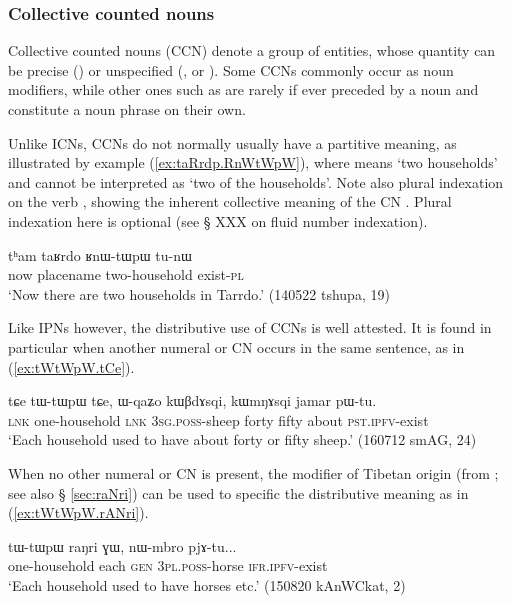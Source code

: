 \subsubsection{Collective counted nouns} \label{sec:CCN}
Collective counted nouns (CCN) denote a group of entities, whose quantity can be precise () or unspecified (,  or ). Some CCNs commonly occur as noun modifiers, while other ones such as  are rarely if ever preceded by a noun and constitute a noun phrase on their own.

Unlike ICNs, CCNs do not normally usually have a partitive meaning, as illustrated by example (\ref{ex:taRrdp.RnWtWpW}), where  means `two households' and cannot be interpreted as `two of the households'. Note also plural indexation on the verb , showing the inherent collective meaning of the CN . Plural indexation here is optional (see § XXX on fluid number indexation).

\begin{exe}
\ex \label{ex:taRrdp.RnWtWpW}
\gll tʰam taʁrdo ʁnɯ-tɯpɯ tu-nɯ \\
now placename two-household exist-\textsc{pl} \\
\glt `Now there are two households in Tarrdo.' (140522 tshupa, 19)
\end{exe} 

Like IPNs however, the distributive use of CCNs is well attested. It is found in particular when another numeral or CN occurs in the same sentence, as in (\ref{ex:tWtWpW.tCe}).

\begin{exe}
\ex \label{ex:tWtWpW.tCe}
\gll tɕe tɯ-tɯpɯ tɕe, ɯ-qaʑo kɯβdɤsqi, kɯmŋɤsqi jamar pɯ-tu. \\
\textsc{lnk} one-household \textsc{lnk} \textsc{3sg}.\textsc{poss}-sheep forty fifty about \textsc{pst}.\textsc{ipfv}-exist \\
\glt `Each household used to have about forty or fifty sheep.' (160712 smAG, 24)
\end{exe} 

When no other numeral or CN is present, the modifier of Tibetan origin  (from ; see also § \ref{sec:raNri}) can be used to specific the distributive meaning as in (\ref{ex:tWtWpW.rANri}).

\begin{exe}
\ex \label{ex:tWtWpW.rANri}
\gll tɯ-tɯpɯ raŋri ɣɯ, nɯ-mbro pjɤ-tu... \\
one-household  each \textsc{gen} \textsc{3pl}.\textsc{poss}-horse \textsc{ifr}.\textsc{ipfv}-exist \\
\glt `Each household used to have horses etc.' (150820 kAnWCkat, 2)
\end{exe} 

